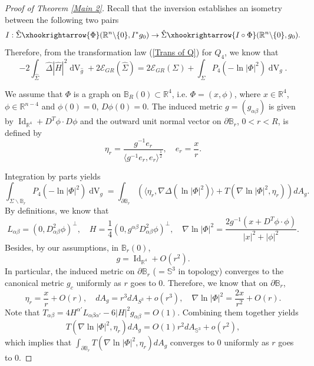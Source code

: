 \documentclass[11pt,letterpaper]{amsart}
\DeclareMathOperator{\Id}{Id}
\DeclareMathOperator{\dvol}{dV}
\newcommand{\mE}{\mathcal{E}}
\newcommand{\bR}{\mathbb{R}}
\theoremstyle{definition}
\theoremstyle{remark}
\numberwithin{equation}{section}
\begin{document}
\begin{proof}[Proof of Theorem \ref{Main 2}]
Recall that the inversion establishes an isometry between the following two pairs
\begin{equation*}
    I: \hat{\Sigma}\xhookrightarrow{\Phi}(\bR^n\backslash \{0\}, I^{*}g_0) \to \hat{\Sigma}\xhookrightarrow{I\circ \Phi}(\bR^n\backslash \{0\}, g_0).
\end{equation*}
Therefore, from the transformation law (\ref{Trans of Q}) for $Q_4$, we know that
\begin{equation*}
    -2\int_{\hat{\Sigma}}\hat{\Delta}|\hat{H}|^2\dvol_{\hat{g}}+2\mE_{GR}(\hat{\Sigma})=2\mE_{GR}(\Sigma)+\int_{\Sigma}P_4 \left(-\ln |\Phi|^2\right)\dvol_g.
\end{equation*}

We assume that $\Phi$ is a graph on $\mathbb{B}_R(0)\subset \bR^4$, i.e. $\Phi=(x, \phi)$, where $x\in \bR^4$, $\phi\in \bR^{n-4}$ and $\phi(0)=0$, $D\phi(0)=0$. The induced metric $g=(g_{\alpha\beta})$ is given by $\Id_{\bR^4}+D^{T}\phi\cdot D\phi$ and the outward unit normal vector on $\partial \mathbb{B}_r$, $0<r<R$, is defined by
\begin{equation*}
    \eta_r=\frac{g^{-1}e_r}{\langle g^{-1}e_r, e_r\rangle ^{\frac{1}{2}}}, \quad e_r=\frac{x}{r}.
\end{equation*}

Integration by parts yields
\begin{equation}
    \int_{\Sigma \backslash \mathbb{B}_r}P_4 \left(-\ln |\Phi|^2\right)\dvol_g=\int_{\partial \mathbb{B}_r}\left(\langle \eta_r, \nabla \Delta \left(\ln |\Phi|^2\right)\rangle+T\left(\nabla \ln |\Phi|^2, \eta_r\right)\right)dA_g.
\end{equation}
By definitions, we know that
\begin{equation*}
    L_{\alpha\beta}=(0, D^2_{\alpha\beta}\phi)^{\perp}, \quad H=\frac{1}{4}(0, g^{\alpha\beta}D^2_{\alpha\beta}\phi)^{\perp}, \quad \nabla \ln |\Phi|^2=\frac{2g^{-1}\left(x+D^{T}\phi\cdot \phi\right)}{|x|^2+|\phi|^2}.
\end{equation*}
Besides, by our assumptions, in $\mathbb{B}_r(0)$, 
\begin{equation*}
    g=\Id_{\bR^4}+O(r^2).
\end{equation*}
In particular, the induced metric on $\partial \mathbb{B}_r$ ($=\mathbb{S}^3$ in topology) converges to the canonical metric $g_c$ uniformly as $r$ goes to $0$. Therefore, we know that on $\partial \mathbb{B}_r$,
\begin{equation}\label{area}
    \eta_r=\frac{x}{r}+O(r), \quad dA_g=r^3dA_{S^3}+o(r^3), \quad \nabla \ln |\Phi|^2=\frac{2x}{r^2}+O(r).
\end{equation}
Note that $T_{\alpha\beta}=4H^{\alpha'}L_{\alpha\beta\alpha'}-6|H|^2 g_{\alpha\beta}=O(1)$. Combining them together yields
\begin{equation*}
      T\left(\nabla \ln |\Phi|^2, \eta_r\right)dA_g=O(1)r^2dA_{\mathbb{S}^3}+o(r^2),
\end{equation*}
which implies that $\int_{\partial \mathbb{B}_r}T\left(\nabla \ln |\Phi|^2, \eta_r\right)dA_g$ converges to $0$ uniformly as $r$ goes to $0$.


\end{proof}
\end{document}
